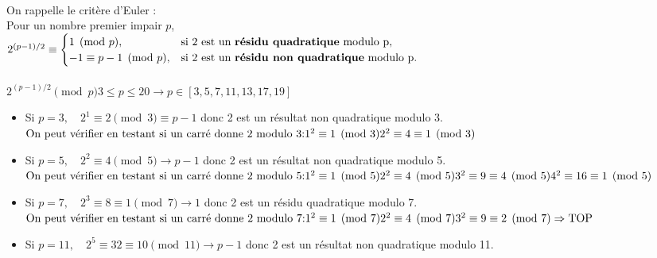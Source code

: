 \begin{solution}
    \text{  } \\
    On rappelle le critère d'Euler : \\
    Pour un nombre premier impair $p$, \\
    \(
        2^{(p-1)/2} \equiv 
        \begin{cases}
        1 \pmod{p}, & \text{si 2 est un \textbf{résidu quadratique} modulo p}, \\
        -1 \equiv p-1 \pmod{p}, & \text{si 2 est un \textbf{résidu non quadratique} modulo p}.
        \end{cases}
    \) \\ \\
    
    \(
    2^{(p-1)/2} \pmod{p} 3 \leq p \leq 20 \rightarrow p \in [3, 5, 7, 11, 13, 17, 19] 
    \) 

    \begin{itemize}
        \item Si $p = 3, \quad 2^1 \equiv 2 \pmod{3} \equiv p-1$ donc 2 est un résultat non quadratique modulo 3.
        \(
        \text{On peut vérifier en testant si un carré donne 2 modulo 3:} \\
        1^2 \equiv 1 \pmod{3} \\
        2^2 \equiv 4 \equiv 1 \pmod{3}
        \)

        \item Si $p = 5, \quad 2^2 \equiv 4 \pmod{5} \rightarrow p-1$ donc 2 est un résultat non quadratique modulo 5.
        \(
        \text{On peut vérifier en testant si un carré donne 2 modulo 5:} \\
        1^2 \equiv 1 \pmod{5} \\
        2^2 \equiv 4 \pmod{5} \\
        3^2 \equiv 9 \equiv 4 \pmod{5} \\
        4^2 \equiv 16 \equiv 1 \pmod{5}
        \)

        \item Si $p = 7, \quad 2^3 \equiv 8 \equiv 1 \pmod{7} \rightarrow 1$ donc 2 est un résidu quadratique modulo 7.
         \(
        \text{On peut vérifier en testant si un carré donne 2 modulo 7:} \\
        1^2 \equiv 1 \pmod{7} \\
        2^2 \equiv 4 \pmod{7} \\
        3^2 \equiv 9 \equiv 2 \pmod{7} \Rightarrow \text{TOP}
        \)

        \item Si $p = 11, \quad 2^5 \equiv 32 \equiv 10 \pmod{11} \rightarrow p-1$ donc 2 est un résultat non quadratique modulo 11.


\end{itemize}
\end{solution}

